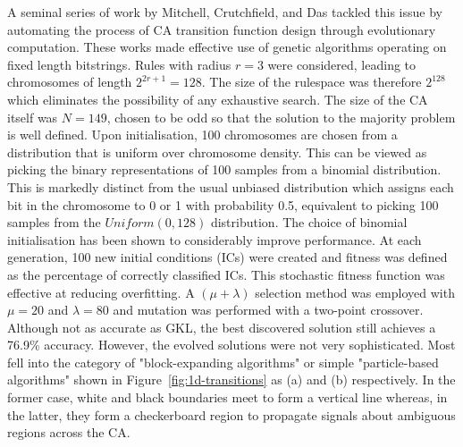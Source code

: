 A seminal series of work by Mitchell, Crutchfield, and Das\cite{mitchell1996evolving} tackled this issue by automating the process of CA transition function design through evolutionary computation. These works made effective use of genetic algorithms operating on fixed length bitstrings. Rules with radius $r = 3$ were considered, leading to chromosomes of length $2^{2r+1}=128$. The size of the rulespace was therefore $2^{128}$ which eliminates the possibility of any exhaustive search. The size of the CA itself was $N=149$, chosen to be odd so that the solution to the majority problem is well defined. Upon initialisation, 100 chromosomes are chosen from a distribution that is uniform over chromosome density. This can be viewed as picking the binary representations of 100 samples from a binomial distribution. This is markedly distinct from the usual unbiased distribution which assigns each bit in the chromosome to 0 or 1 with probability 0.5, equivalent to picking 100 samples from the $Uniform(0, 128)$ distribution. The choice of binomial initialisation has been shown to considerably improve performance\cite{mitchell1994evolving}. At each generation, 100 new initial conditions (ICs) were created and fitness was defined as the percentage of correctly classified ICs. This stochastic fitness function was effective at reducing overfitting. A $(\mu+\lambda)$ selection method was employed with $\mu=20$ and $\lambda=80$ and mutation was performed with a two-point crossover. Although not as accurate as GKL, the best discovered solution still achieves a 76.9\% accuracy. However, the evolved solutions were not very sophisticated. Most fell into the category of "block-expanding algorithms" or simple "particle-based algorithms" shown in Figure~\ref{fig:1d-transitions} as (a) and (b) respectively. In the former case, white and black boundaries meet to form a vertical line whereas, in the latter, they form a checkerboard region to propagate signals about ambiguous regions across the CA.

